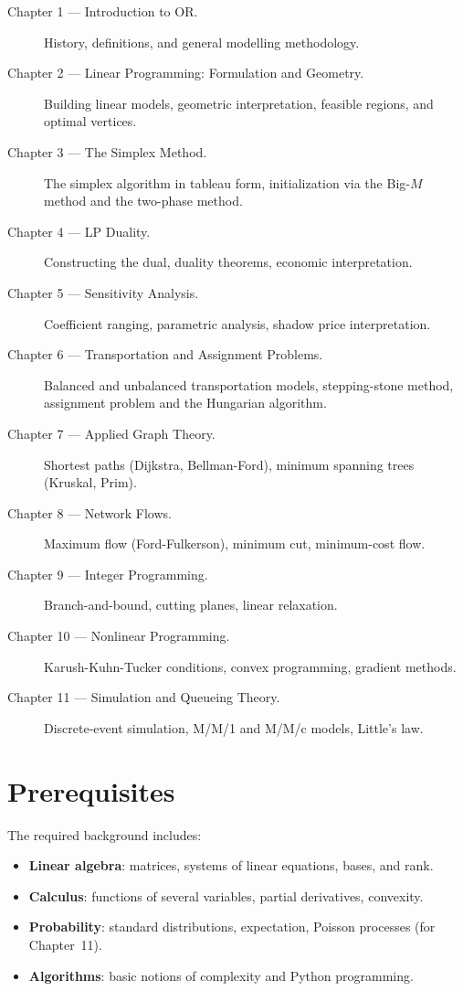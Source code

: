 \begin{description}
  \item[Chapter 1 --- Introduction to OR.]
    History, definitions, and general modelling methodology.
  \item[Chapter 2 --- Linear Programming: Formulation and Geometry.]
    Building linear models, geometric interpretation, feasible regions, and
    optimal vertices.
  \item[Chapter 3 --- The Simplex Method.]
    The simplex algorithm in tableau form, initialization via the Big-$M$
    method and the two-phase method.
  \item[Chapter 4 --- LP Duality.]
    Constructing the dual, duality theorems, economic interpretation.
  \item[Chapter 5 --- Sensitivity Analysis.]
    Coefficient ranging, parametric analysis, shadow price interpretation.
  \item[Chapter 6 --- Transportation and Assignment Problems.]
    Balanced and unbalanced transportation models, stepping-stone method,
    assignment problem and the Hungarian algorithm.
  \item[Chapter 7 --- Applied Graph Theory.]
    Shortest paths (Dijkstra, Bellman-Ford), minimum spanning trees (Kruskal,
    Prim).
  \item[Chapter 8 --- Network Flows.]
    Maximum flow (Ford-Fulkerson), minimum cut, minimum-cost flow.
  \item[Chapter 9 --- Integer Programming.]
    Branch-and-bound, cutting planes, linear relaxation.
  \item[Chapter 10 --- Nonlinear Programming.]
    Karush-Kuhn-Tucker conditions, convex programming, gradient methods.
  \item[Chapter 11 --- Simulation and Queueing Theory.]
    Discrete-event simulation, M/M/1 and M/M/c models, Little's law.
\end{description}

\section*{Prerequisites}

The required background includes:
\begin{itemize}
  \item \textbf{Linear algebra}: matrices, systems of linear equations, bases,
        and rank.
  \item \textbf{Calculus}: functions of several variables, partial derivatives,
        convexity.
  \item \textbf{Probability}: standard distributions, expectation, Poisson
        processes (for Chapter~11).
  \item \textbf{Algorithms}: basic notions of complexity and Python
        programming.
\end{itemize}

